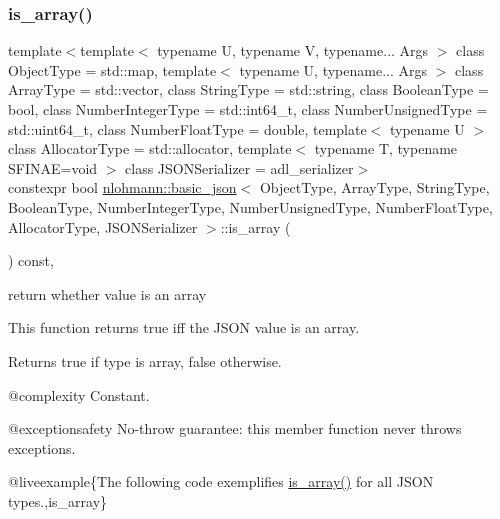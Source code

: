 \subsubsection{\texorpdfstring{is\_array()}{is\_array()}}
{\footnotesize\ttfamily template$<$template$<$ typename U, typename V, typename... Args $>$ class Object\+Type = std\+::map, template$<$ typename U, typename... Args $>$ class Array\+Type = std\+::vector, class String\+Type  = std\+::string, class Boolean\+Type  = bool, class Number\+Integer\+Type  = std\+::int64\+\_\+t, class Number\+Unsigned\+Type  = std\+::uint64\+\_\+t, class Number\+Float\+Type  = double, template$<$ typename U $>$ class Allocator\+Type = std\+::allocator, template$<$ typename T, typename S\+F\+I\+N\+A\+E=void $>$ class J\+S\+O\+N\+Serializer = adl\+\_\+serializer$>$ \\
constexpr bool \mbox{\hyperlink{classnlohmann_1_1basic__json}{nlohmann\+::basic\+\_\+json}}$<$ Object\+Type, Array\+Type, String\+Type, Boolean\+Type, Number\+Integer\+Type, Number\+Unsigned\+Type, Number\+Float\+Type, Allocator\+Type, J\+S\+O\+N\+Serializer $>$\+::is\+\_\+array (\begin{DoxyParamCaption}{ }\end{DoxyParamCaption}) const\hspace{0.3cm}{\ttfamily [inline]}, {\ttfamily [noexcept]}}



return whether value is an array 

This function returns true iff the J\+S\+ON value is an array.

\begin{DoxyReturn}{Returns}
{\ttfamily true} if type is array, {\ttfamily false} otherwise.
\end{DoxyReturn}
@complexity Constant.

@exceptionsafety No-\/throw guarantee\+: this member function never throws exceptions.

@liveexample\{The following code exemplifies {\ttfamily \mbox{\hyperlink{classnlohmann_1_1basic__json_aef9ce5dd2381caee1f8ddcdb5bdd9c65}{is\+\_\+array()}}} for all J\+S\+ON types.,is\+\_\+array\}

